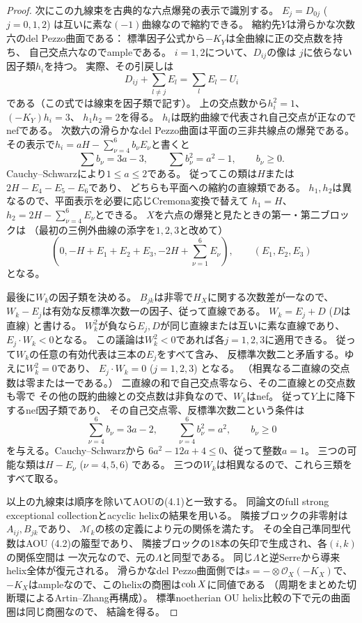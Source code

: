 \begin{proof}
次にこの九線束を古典的な六点爆発の表示で識別する。
$E_j=D_{0j}$ ($j=0,1,2$) は互いに素な$(-1)$曲線なので縮約できる。
縮約先$Y$は滑らかな次数六のdel Pezzo曲面である：
標準因子公式から$-K_Y$は全曲線に正の交点数を持ち、
自己交点六なのでampleである。
$i=1,2$について、$D_{ij}$の像は
$j$に依らない因子類$h_i$を持つ。
実際、その引戻しは
\[
 D_{ij}+\sum_{l\ne j}E_l=\sum_l E_l-U_i
\]
である（この式では線束を因子類で記す）。
上の交点数から$h_i^2=1$、$(-K_Y)h_i=3$、
$h_1h_2=2$を得る。
$h_i$は既約曲線で代表され自己交点が正なのでnefである。
次数六の滑らかなdel Pezzo曲面は平面の三非共線点の爆発である。
その表示で$h_i=aH-\sum_{\nu=4}^6 b_\nu E_\nu$と書くと
\[
 \sum b_\nu=3a-3,\qquad \sum b_\nu^2=a^2-1,\qquad b_\nu\geq0.
\]
Cauchy--Schwarzにより$1\leq a\leq2$である。
従ってこの類は$H$または$2H-E_4-E_5-E_6$であり、
どちらも平面への縮約の直線類である。
$h_1,h_2$は異なるので、平面表示を必要に応じCremona変換で替えて
$h_1=H$、$h_2=2H-\sum_{\nu=4}^6E_\nu$とできる。
$X$を六点の爆発と見たときの第一・第二ブロックは
（最初の三例外曲線の添字を$1,2,3$と改めて）
\[
 (0,-H+E_1+E_2+E_3,-2H+\sum_{\nu=1}^6 E_\nu),
 \qquad(E_1,E_2,E_3)
\]
となる。

最後に$W_k$の因子類を決める。
$B_{jk}$は非零で$H_X$に関する次数差が一なので、
$W_k-E_j$は有効な反標準次数一の因子、従って直線である。
$W_k=E_j+D$ ($D$は直線) と書ける。
$W_k^2$が負なら$E_j,D$が同じ直線または互いに素な直線であり、
$E_j\cdot W_k<0$となる。
この議論は$W_k^2<0$であれば各$j=1,2,3$に適用できる。
従って$W_k$の任意の有効代表は三本の$E_j$をすべて含み、
反標準次数二と矛盾する。ゆえに$W_k^2=0$であり、
$E_j\cdot W_k=0$ ($j=1,2,3$) となる。
（相異なる二直線の交点数は零または一である。）
二直線の和で自己交点零なら、その二直線との交点数も零で
その他の既約曲線との交点数は非負なので、$W_k$はnef。
従って$Y$上に降下するnef因子類であり、
その自己交点零、反標準次数二という条件は
\[
 \sum_{\nu=4}^6 b_\nu=3a-2,\qquad
 \sum_{\nu=4}^6 b_\nu^2=a^2,\qquad b_\nu\geq0
\]
を与える。Cauchy--Schwarzから
$6a^2-12a+4\leq0$、従って整数$a=1$。
三つの可能な類は$H-E_\nu$ ($\nu=4,5,6$) である。
三つの$W_k$は相異なるので、これら三類をすべて取る。

以上の九線束は順序を除いてAOUの(4.1)と一致する。
同論文のfull strong exceptional collectionとacyclic helixの結果を用いる。
隣接ブロックの非零射は$A_{ij},B_{jk}$であり、
$\mathscr M_k$の核の定義により元の関係を満たす。
その全自己準同型代数はAOU (4.2)の箙型であり、
隣接ブロックの18本の矢印で生成され、各$(i,k)$の関係空間は
一次元なので、元の$\Lambda$と同型である。
同じ$\Lambda$と逆Serreから導来helix全体が復元される。
滑らかなdel Pezzo曲面側では$s=-\otimes\mathcal O_X(-K_X)$で、
$-K_X$はampleなので、このhelixの商圏は$\operatorname{coh} X$に同値である
（周期をまとめた切断環によるArtin--Zhang再構成）。
標準noetherian OU helix比較の下で元の曲面圏は同じ商圏なので、
結論を得る。
\end{proof}

